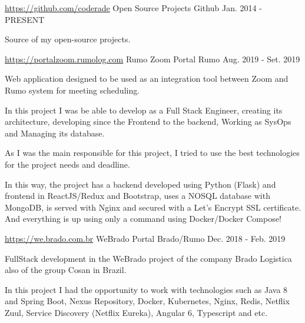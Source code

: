 

\begin{cventries}
  \cventry
    {\hyperref[https://github.com/coderade]{https://github.com/coderade}} %
    {Open Source Projects}%
    {Github} %
    {Jan. 2014 - PRESENT} %
    {
      \begin{cvitems} %
       \item{Source of my open-source projects.}
      \end{cvitems}
    }
  \cventry
     {\hyperref[https://portalzoom.rumolog.com]{https://portalzoom.rumolog.com}}
    {Rumo Zoom Portal }%
    {Rumo} %
    {Aug. 2019 - Set. 2019} %
    {
      \begin{cvitems} %
       \item{Web application designed to be used as an integration tool between Zoom and Rumo system for meeting scheduling.}
       \item{In this project I was be able to develop as a Full Stack Engineer, creating its architecture, developing since the Frontend to the backend, Working as SysOps and Managing its database.}
        \item{As I was the main responsible for this project, I tried to use the best technologies for the project needs and deadline.}
         \item{In this way, the project has a backend developed using Python (Flask) and frontend in ReactJS/Redux and Bootstrap, uses a NOSQL database with MongoDB, is served with Nginx and secured with a Let’s Encrypt SSL certificate. And everything is up using only a command using Docker/Docker Compose!}
      \end{cvitems}
    }

\cventry
 {\hyperref[http://we.brado.com.br/v2]{https://we.brado.com.br}} %
{WeBrado Portal }%
{Brado/Rumo} %
{Dec. 2018 - Feb. 2019} %
{
  \begin{cvitems} %
   \item{FullStack development in the WeBrado project of the company Brado Logistica also of the group Cosan in Brazil.}
   \item{In this project I had the opportunity to work with technologies such as Java 8 and Spring Boot, Nexus Repository, Docker, Kubernetes, Nginx, Redis, Netflix Zuul, Service Discovery (Netflix Eureka), Angular 6, Typescript and etc.}
  \end{cvitems}
}


\end{cventries}
